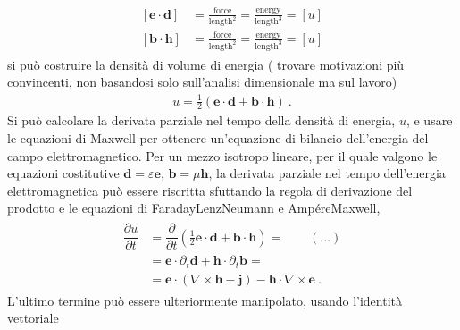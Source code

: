 \documentclass[letterpaper,10pt,italian]{jupyterBook}
\begin{document}
\begin{equation*}
\begin{split}\begin{aligned}
\left[\mathbf{e} \cdot \mathbf{d}\right] & = \frac{\text{force}}{\text{length}^2} = \frac{\text{energy}}{\text{length}^3} = [u] \\
[\mathbf{b} \cdot \mathbf{h}] & = \frac{\text{force}}{\text{length}^2} = \frac{\text{energy}}{\text{length}^3} = [u]
\end{aligned}\end{split}
\end{equation*}
\sphinxAtStartPar
si può costruire la densità di volume di energia  ( trovare motivazioni più convincenti, non basandosi solo sull’analisi dimensionale ma sul lavoro)
\begin{equation*}
\begin{split}u = \frac{1}{2} \left( \mathbf{e} \cdot \mathbf{d} + \mathbf{b} \cdot \mathbf{h} \right) \ .\end{split}
\end{equation*}
\sphinxAtStartPar
Si può calcolare la derivata parziale nel tempo della densità di energia, \(u\), e usare le equazioni di Maxwell per ottenere un’equazione di bilancio dell’energia del campo elettromagnetico. Per un mezzo isotropo lineare, per il quale valgono le equazioni costitutive \(\mathbf{d} = \varepsilon \mathbf{e}\), \(\mathbf{b} = \mu \mathbf{h}\), la derivata parziale nel tempo dell’energia elettromagnetica può essere riscritta sfuttando la regola di derivazione del prodotto e le equazioni di Faraday\sphinxhyphen{}Lenz\sphinxhyphen{}Neumann e Ampére\sphinxhyphen{}Maxwell,
\begin{equation*}
\begin{split}\begin{aligned}
\dfrac{\partial u}{\partial t} & = \dfrac{\partial}{\partial t}\left( \frac{1}{2} \mathbf{e} \cdot \mathbf{d} + \mathbf{b} \cdot \mathbf{h} \right) =  \qquad (...) \\
& = \mathbf{e} \cdot \partial_t \mathbf{d} + \mathbf{h} \cdot \partial_t \mathbf{b} = \\
& = \mathbf{e} \cdot (\nabla \times \mathbf{h} - \mathbf{j}) - \mathbf{h} \cdot \nabla \times \mathbf{e} \ .
\end{aligned}\end{split}
\end{equation*}
\sphinxAtStartPar
L’ultimo termine può essere ulteriormente manipolato, usando l’identità vettoriale
\end{document}
